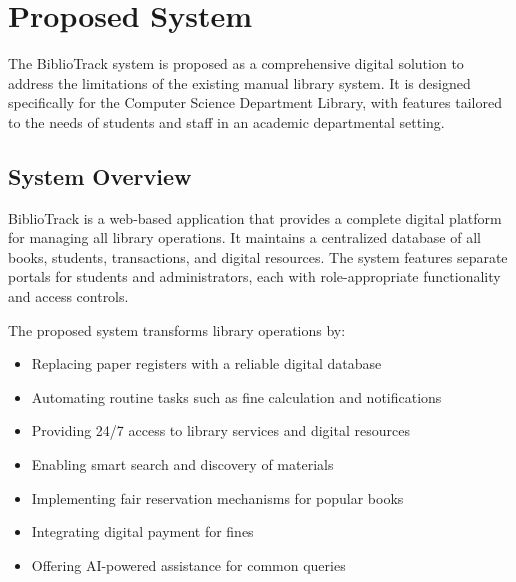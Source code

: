 \documentclass[12pt,a4paper]{report}
\begin{document}
\section{Proposed System}
\label{sec:proposed}

The BiblioTrack system is proposed as a comprehensive digital solution to address the limitations of the existing manual library system. It is designed specifically for the Computer Science Department Library, with features tailored to the needs of students and staff in an academic departmental setting.

\subsection{System Overview}

BiblioTrack is a web-based application that provides a complete digital platform for managing all library operations. It maintains a centralized database of all books, students, transactions, and digital resources. The system features separate portals for students and administrators, each with role-appropriate functionality and access controls.

The proposed system transforms library operations by:

\begin{itemize}
    \item Replacing paper registers with a reliable digital database
    \item Automating routine tasks such as fine calculation and notifications
    \item Providing 24/7 access to library services and digital resources
    \item Enabling smart search and discovery of materials
    \item Implementing fair reservation mechanisms for popular books
    \item Integrating digital payment for fines
    \item Offering AI-powered assistance for common queries
\end{itemize}
\end{document}
